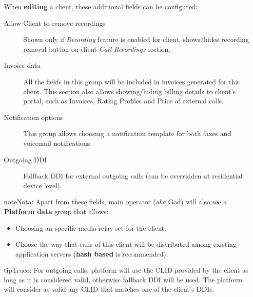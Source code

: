 \documentclass[letterpaper,10pt,spanish]{sphinxmanual}
\begin{document}
When \textbf{editing} a client, these additional fields can be configured:
\begin{description}
\item[{Allow Client to remove recordings}] \leavevmode{}\label{administration_portal/brand/clients/residential:term-allow-client-to-remove-recordings}
Shown only if \emph{Recording} feature is enabled for client, shows/hides recording
removal button on client \emph{Call Recordings} section.

\item[{Invoice data}] \leavevmode{}\label{administration_portal/brand/clients/residential:term-invoice-data}
All the fields in this group will be included in invoices generated for this client. This section also allows
showing/hiding billing details to client's portal, such as Invoices, Rating Profiles and Price of external calls.

\item[{Notification options}] \leavevmode{}\label{administration_portal/brand/clients/residential:term-notification-options}
This group allows choosing a notification template for both faxes and voicemail notifications.

\item[{Outgoing DDI}] \leavevmode{}\label{administration_portal/brand/clients/residential:term-outgoing-ddi}
Fallback DDI for external outgoing calls (can be overridden at residential device level).

\end{description}

\begin{notice}{note}{Nota:}
Apart from these fields, main operator (\emph{aka} God) will also see a \textbf{Platform data} group that allows:
\begin{itemize}
\item {} 
Choosing an specific media relay set for the client.

\item {} 
Choose the way that calls of this client will be distributed among existing application servers (\textbf{hash based} is recommended).

\end{itemize}
\end{notice}

\begin{notice}{tip}{Truco:}
For outgoing calls, platform will use the CLID provided by the client as long as it is considered valid, otherwise fallback DDI
will be used. The platform will consider as valid any CLID that matches one of the client's DDIs.
\end{notice}
\end{document}
